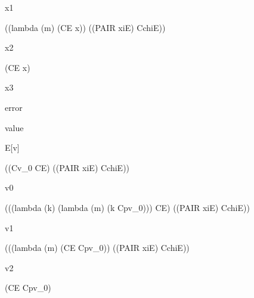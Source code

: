 \documentclass[ms,electronic,twosidetoc,letterpaper,chaptercenter,parttop]{byumsphd}
\begin{document}
\begin{singlespace}
x1
\begin{schemedisplay}
((lambda (m) (CE x)) ((PAIR xiE) CchiE))
\end{schemedisplay}

x2
\begin{schemedisplay}
(CE x)
\end{schemedisplay}

x3
\begin{schemedisplay}
error
\end{schemedisplay}

value
\begin{schemedisplay}
E[v]
\end{schemedisplay}

\begin{schemedisplay}
((Cv_0 CE) ((PAIR xiE) CchiE))
\end{schemedisplay}

v0
\begin{schemedisplay}
(((lambda (k) (lambda (m) (k Cpv_0))) CE) ((PAIR xiE) CchiE))
\end{schemedisplay}

v1
\begin{schemedisplay}
(((lambda (m) (CE Cpv_0)) ((PAIR xiE) CchiE))
\end{schemedisplay}

v2
\begin{schemedisplay}
(CE Cpv_0)
\end{schemedisplay}
\end{singlespace}



\end{document}
